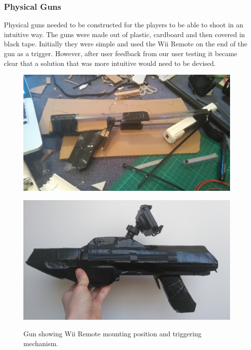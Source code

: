 \documentclass[a4paper,11pt]{article}
\begin{document}
\subsubsection{Physical Guns}
Physical guns needed to be constructed for the players to be able to shoot in an intuitive way. The guns were made out of plastic, cardboard and then covered in black tape. Initially they were simple and used the Wii Remote on the end of the gun as a trigger. However, after user feedback from our user testing it  became clear that a solution that was more intuitive would need to be devised.


\begin{figure}[ht]
  \centering
  \captionsetup{width=.45\textwidth}
  
  \begin{minipage}[t]{.5\textwidth}
      \centering
      \includegraphics[width=.9\textwidth]{gun}
      \caption{Gun showing Wii Remote mounting position and triggering mechanism.}
      \label{fig:gun1}
  \end{minipage}%
  \begin{minipage}[t]{.5\textwidth}
    \centering
    \includegraphics[width=.9\textwidth]{gun2}
    \label{fig:gun2}
  \end{minipage}
\end{figure}
\end{document}

